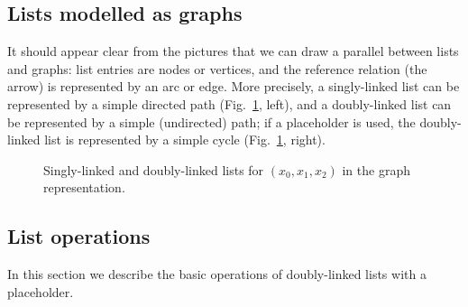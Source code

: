 \documentclass[a4paper]{book}
\theoremstyle{changebreak}                %
\begin{document}
\subsection{Lists modelled as graphs}
It should appear clear from the pictures that we can draw a parallel
between lists and graphs: list entries are
nodes or vertices, and the reference
relation (the arrow) is represented by an arc or
edge. More precisely, a singly-linked list can be
represented by a simple directed path
(Fig.~\ref{f:listgraph}, left), and a doubly-linked list can be
represented by a simple (undirected) path; if a
placeholder is used, the doubly-linked list is
represented by a simple cycle
(Fig.~\ref{f:listgraph}, right).
\begin{figure}[!ht]
\begin{center}
\begin{minipage}{5cm}
\end{minipage}
\hspace*{1cm}
\begin{minipage}{5cm}
\end{minipage}
\end{center}
\caption{Singly-linked and doubly-linked lists for $(x_0,x_1,x_2)$ in
  the graph representation.}
\label{f:listgraph}
\end{figure}

\subsection{List operations}
In this section we describe the basic operations of doubly-linked
lists with a placeholder.
\end{document}
